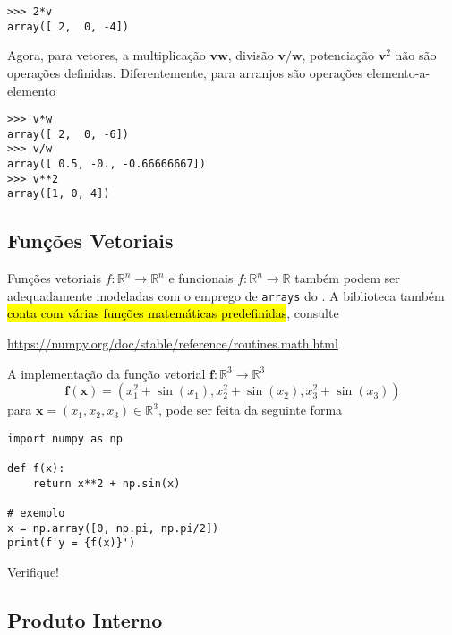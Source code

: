 \begin{ex}
\begin{lstlisting}
>>> 2*v
array([ 2,  0, -4])
\end{lstlisting}

  Agora, para vetores, a multiplicação $\pmb{v}\pmb{w}$, divisão $\pmb{v}/\pmb{w}$, potenciação $\pmb{v}^2$ não são operações definidas. Diferentemente, para arranjos são operações elemento-a-elemento

\begin{lstlisting}
>>> v*w
array([ 2,  0, -6])
>>> v/w
array([ 0.5, -0., -0.66666667])
>>> v**2
array([1, 0, 4])
\end{lstlisting}

\end{ex}

\subsection{Funções Vetoriais}

Funções vetoriais $f:\mathbb{R}^n\to\mathbb{R}^n$ e funcionais $f:\mathbb{R}^n\to\mathbb{R}$ também podem ser adequadamente modeladas com o emprego de \lstinline+arrays+ do \hl{{\numpy}}. A biblioteca também \hl{conta com várias funções matemáticas predefinidas}, consulte
\begin{center}
  \url{https://numpy.org/doc/stable/reference/routines.math.html}
\end{center}

\begin{ex}
  A implementação da função vetorial $\pmb{f}:\mathbb{R}^3\to\mathbb{R}^3$
  \begin{equation}
    \pmb{f}(\pmb{x}) = (x_1^2+\sin(x_1), x_2^2+\sin(x_2), x_3^2+\sin(x_3))
  \end{equation}
  para $\pmb{x} = (x_1, x_2, x_3)\in\mathbb{R}^3$, pode ser feita da seguinte forma

\begin{lstlisting}
import numpy as np

def f(x):
    return x**2 + np.sin(x)

# exemplo
x = np.array([0, np.pi, np.pi/2])
print(f'y = {f(x)}')
\end{lstlisting}

Verifique!
\end{ex}

\subsection{Produto Interno}

